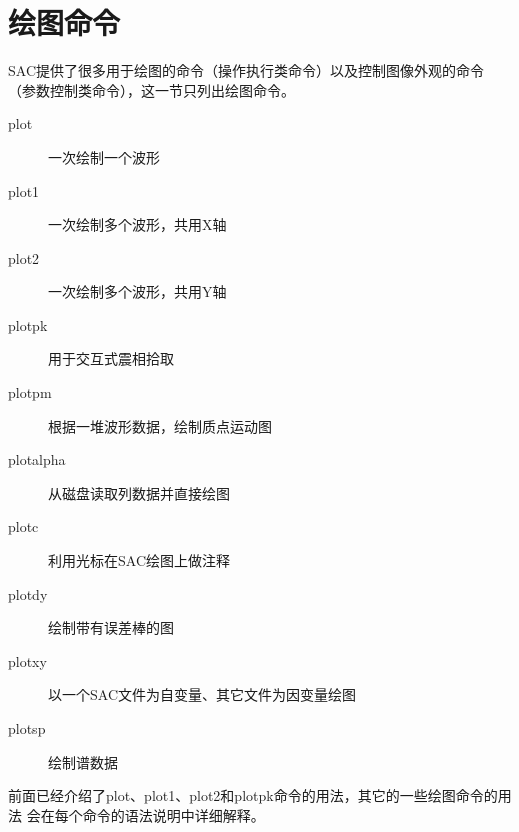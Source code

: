 \section{绘图命令}
SAC提供了很多用于绘图的命令（操作执行类命令）以及控制图像外观的命令
（参数控制类命令），这一节只列出绘图命令。

\begin{description}
\item [plot] 一次绘制一个波形
\item [plot1] 一次绘制多个波形，共用X轴
\item [plot2] 一次绘制多个波形，共用Y轴
\item [plotpk] 用于交互式震相拾取
\item [plotpm] 根据一堆波形数据，绘制质点运动图
\item [plotalpha] 从磁盘读取列数据并直接绘图
\item [plotc] 利用光标在SAC绘图上做注释
\item [plotdy] 绘制带有误差棒的图
\item [plotxy] 以一个SAC文件为自变量、其它文件为因变量绘图
\item [plotsp] 绘制谱数据
\end{description}

前面已经介绍了plot、plot1、plot2和plotpk命令的用法，其它的一些绘图命令的用法
会在每个命令的语法说明中详细解释。
